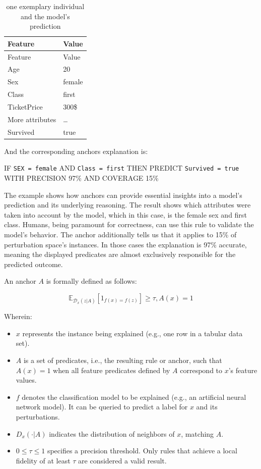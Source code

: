 \documentclass[12pt,]{krantz}
\providecommand{\tightlist}{%
  \setlength{\itemsep}{0pt}\setlength{\parskip}{0pt}}
\begin{document}
\begin{longtable}[]{@{}ll@{}}
\caption{one exemplary individual and the model's
prediction}\tabularnewline
\toprule
Feature & Value\tabularnewline
\midrule
\endfirsthead
\toprule
Feature & Value\tabularnewline
\midrule
\endhead
Age & 20\tabularnewline
Sex & female\tabularnewline
Class & first\tabularnewline
TicketPrice & 300\$\tabularnewline
More attributes & \ldots{}\tabularnewline
Survived & true\tabularnewline
\bottomrule
\end{longtable}

And the corresponding anchors explanation is:

IF \texttt{SEX\ =\ female} AND \texttt{Class\ =\ first} THEN PREDICT
\texttt{Survived\ =\ true} WITH PRECISION 97\% AND COVERAGE 15\%

The example shows how anchors can provide essential insights into a
model's prediction and its underlying reasoning. The result shows which
attributes were taken into account by the model, which in this case, is
the female sex and first class. Humans, being paramount for correctness,
can use this rule to validate the model's behavior. The anchor
additionally tells us that it applies to 15\% of perturbation space's
instances. In those cases the explanation is 97\% accurate, meaning the
displayed predicates are almost exclusively responsible for the
predicted outcome.

An anchor \(A\) is formally defined as follows:

\[\mathbb{E}_{\mathcal{D}_x(z|A)}[1_{f(x)=f(z)}]\geq\tau,A(x)=1\]

Wherein:

\begin{itemize}
\tightlist
\item
  \(x\) represents the instance being explained (e.g., one row in a
  tabular data set).
\item
  \(A\) is a set of predicates, i.e., the resulting rule or anchor, such
  that \(A(x)=1\) when all feature predicates defined by \(A\)
  correspond to \(x\)'s feature values.
\item
  \(f\) denotes the classification model to be explained (e.g., an
  artificial neural network model). It can be queried to predict a label
  for \(x\) and its perturbations.
\item
  \(D_x (\cdot|A)\) indicates the distribution of neighbors of \(x\),
  matching \(A\).
\item
  \(0 \leq \tau \leq 1\) specifies a precision threshold. Only rules
  that achieve a local fidelity of at least \(\tau\) are considered a
  valid result.
\end{itemize}
\end{document}
